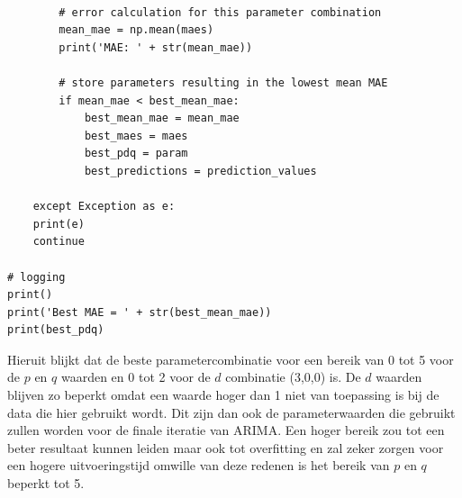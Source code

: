 \begin{verbatim}
        
        # error calculation for this parameter combination
        mean_mae = np.mean(maes)
        print('MAE: ' + str(mean_mae))    
        
        # store parameters resulting in the lowest mean MAE
        if mean_mae < best_mean_mae:
            best_mean_mae = mean_mae
            best_maes = maes
            best_pdq = param
            best_predictions = prediction_values
            
    except Exception as e:
    print(e)
    continue

# logging
print()
print('Best MAE = ' + str(best_mean_mae))
print(best_pdq)
\end{verbatim}

Hieruit blijkt dat de beste parametercombinatie voor een bereik van 0 tot 5 voor de $p$ en $q$ waarden en 0 tot 2 voor de $d$ combinatie (3,0,0) is. De $d$ waarden blijven zo beperkt omdat een waarde hoger dan 1 niet van toepassing is bij de data die hier gebruikt wordt. Dit zijn dan ook de parameterwaarden die gebruikt zullen worden voor de finale iteratie van ARIMA. Een hoger bereik zou tot een beter resultaat kunnen leiden maar ook tot overfitting en zal zeker zorgen voor een hogere uitvoeringstijd omwille van deze redenen is het bereik van $p$ en $q$ beperkt tot 5.\\




